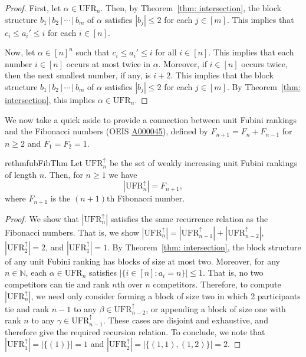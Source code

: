 \documentclass[11pt,reqno]{amsart}
\theoremstyle{definition}
\theoremstyle{notation}
\theoremstyle{openproblem}
\newcommand*{\N}{\mathbb{N}}
\newcommand{\UFR}[1]{\text{UFR}_{#1}}
\begin{document}
\begin{proof}
First, let $\alpha \in \UFR{n}$. 
Then, by Theorem~\ref{thm: intersection}, the block structure $b_1 \,|\, b_2 \,|\, \cdots \,|\, b_m$ of $\alpha$ satisfies $|b_j| \leq 2$ for each $j \in [m]$.
This implies that $c_i \leq a_i' \leq i$ for each $i \in [n]$.   

Now, let $\alpha \in [n]^n$ such that $c_i \leq a_i' \leq i$ for all $i \in [n]$. 
This implies that each number $i \in [n]$ occurs at most twice in $\alpha$.
Moreover, if $i \in [n]$ occurs twice, then the next smallest number, if any, is $i+2$. 
This implies that the block structure $b_1 \,|\, b_2 \,|\, \cdots \,|\, b_m$ of $\alpha$ satisfies $|b_j| \leq 2$ for each $j \in [m]$.
By Theorem~\ref{thm: intersection}, this implies $\alpha \in \UFR{n}$. 
\end{proof}

We now take a quick aside to provide a connection between unit Fubini rankings and the Fibonacci numbers (OEIS \href{https://oeis.org/A000045}{A000045}), defined by $F_{n+1}=F_{n}+F_{n-1}$ for $n\geq 2$ and $F_1=F_2=1$.
\begin{restatable}{rethm}{fubFibThm}
\label{thm:fubFib}
Let $\UFR{n}^{\uparrow}$ be the set of weakly increasing unit Fubini rankings of length $n$. 
Then, for $n \geq 1$ we have
\begin{equation*}
    |\UFR{n}^{\uparrow}|=F_{n+1},
\end{equation*}
where $F_{n+1}$ is the $(n+1)$th Fibonacci number.
\end{restatable}
\begin{proof}
We show that $|\UFR{n}^{\uparrow}|$ satisfies the same recurrence relation as the Fibonacci numbers. 
That is, we show $|\UFR{n}^{\uparrow}|=|\UFR{n-1}^{\uparrow}|+|\UFR{n-2}^{\uparrow}|$, $|\UFR{2}^{\uparrow}| = 2$, and $|\UFR{1}^{\uparrow}|= 1$.
By Theorem~\ref{thm: intersection}, the block structure of any unit Fubini ranking has blocks of size at most two. 
Moreover, for any $n \in \N$, each $\alpha \in \UFR{n}$ satisfies $|\{i \in [n]: a_i = n\}| \leq 1$.
That is, no two competitors can tie and rank $n$th over $n$ competitors.
Therefore, to compute $|\UFR{n}^{\uparrow}|$, we need only consider forming a block of size two in which 2 participants tie and rank $n-1$ to any $\beta \in \UFR{n-2}^{\uparrow}$, or appending a block of size one with rank $n$ to any $\gamma \in \UFR{n-1}^{\uparrow}$.
These cases are disjoint and exhaustive, and therefore give the required recursion relation.
To conclude, we note that $|\UFR{1}^{\uparrow}|=|\{(1)\}|=1$ and 
$|\UFR{2}^{\uparrow}|=|\{(1,1),(1,2)\}|=2$.
\end{proof}
\end{document}
